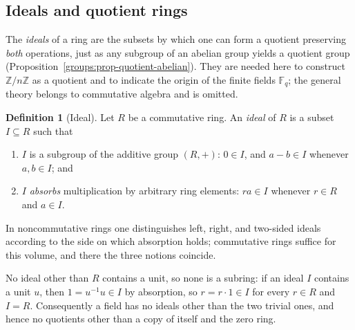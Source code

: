 \documentclass[11pt,a4paper]{article}
\theoremstyle{definition}
\newtheorem{definition}[theorem]{Definition}
\theoremstyle{remark}
\newcommand{\Z}{\ensuremath{\mathbb{Z}}}
\newcommand{\Fq}{\ensuremath{\mathbb{F}_{q}}}
\begin{document}
\subsection{Ideals and quotient rings}\label{ringsfields:subsec-ideals}

The \emph{ideals} of a ring are the subsets by which one can form a quotient
preserving \emph{both} operations, just as any subgroup of an abelian group
yields a quotient group (Proposition~\ref{groups:prop-quotient-abelian}).
They are needed here to construct \(\Z/n\Z\) as a quotient and to indicate
the origin of the finite fields \(\Fq\); the general theory belongs to
commutative algebra and is omitted.

\begin{definition}[Ideal]\label{ringsfields:def-ideal}
Let \(R\) be a commutative ring. An \emph{ideal} of \(R\) is a subset
\(I\subseteq R\) such that
\begin{enumerate}
\item \(I\) is a subgroup of the additive group \((R,+)\): \(0\in I\), and
  \(a-b\in I\) whenever \(a,b\in I\); and
\item \(I\) \emph{absorbs} multiplication by arbitrary ring elements:
  \(ra\in I\) whenever \(r\in R\) and \(a\in I\).
\end{enumerate}
In noncommutative rings one distinguishes left, right, and two-sided
ideals according to the side on which absorption holds; commutative rings
suffice for this volume, and there the three notions coincide.
\end{definition}

No ideal other than \(R\) contains a unit, so none is a subring: if an
ideal \(I\) contains a unit \(u\), then \(1=u^{-1}u\in I\) by absorption,
so \(r=r\cdot 1\in I\) for every \(r\in R\) and \(I=R\). Consequently a
field has no ideals other than the two trivial ones, and hence no quotients
other than a copy of itself and the zero ring.
\end{document}
